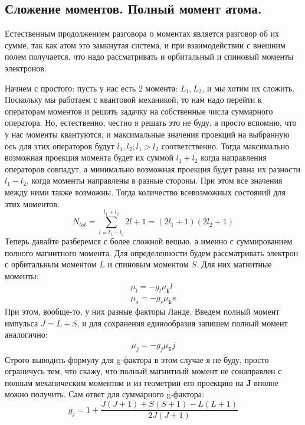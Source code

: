 \documentclass[12pt]{article}
\begin{document}
\subsection{Сложение моментов. Полный момент атома.}
Естественным продолжением разговора о моментах является разговор об их сумме, так как атом это замкнутая система, и при взаимодействии с внешним полем получается, что надо рассматривать и орбитальный и спиновый моменты электронов.

\vspace{1em} \noindent
Начнем с простого: пусть у нас есть 2 момента: $L_1, L_2$, и мы хотим их сложить. Поскольку мы работаем с квантовой механикой, то нам надо перейти к операторам моментов и решить задачку на собственные числа суммарного оператора. Но, естественно, честно я решать это не буду, а просто вспомню, что у нас моменты квантуются, и максимальные значения проекций на выбранную ось для этих операторов будут $l_1, l_2; l_1>l_2$ соответственно. Тогда максимально возможная проекция момента будет их суммой $l_1 + l_2$ когда направления операторов совпадут, а минимально возможная проекция будет равна их разности $l_1 - l_2$, когда моменты направлены в разные стороны. При этом все значения между ними также возможны. Тогда количество всевозможных состояний для этих моментов:
\begin{equation*}
    N_{tot} = \sum\limits_{l=l_1-l_2}^{l_1+l_2}2l+1 = (2l_1+1)(2l_2+1)
\end{equation*}
Теперь давайте разберемся с более сложной вещью, а именно с суммированием полного магнитного момента. Для определенности будем рассматривать электрон с орбитальным моментом $L$ и спиновым моментом $S$. Для них магнитные моменты:
\begin{gather*}
    \mu_l = -g_l\mu_{\text{Б}}l\\
    \mu_s = -g_s\mu_{\text{Б}}s
\end{gather*}
При этом, вообще-то, у них разные факторы Ланде. Введем полный момент импульса $J = L+S$, и для сохранения единообразия запишем полный момент аналогично: 
\begin{gather*}
    \mu_j = -g_j\mu_{\text{Б}}j
\end{gather*}
Строго выводить формулу для g-фактора в этом случае я не буду, просто ограничусь тем, что скажу, что полный магнитный момент не сонаправлен с полным механическим моментом и из геометрии его проекцию на $\textbf{J}$ вполне можно получить. Сам ответ для суммарного g-фактора:
\begin{equation*}
    g_j = 1+\dfrac{J(J+1) + S(S+1) - L(L+1)}{2J(J+1)} 
\end{equation*}
\end{document}
